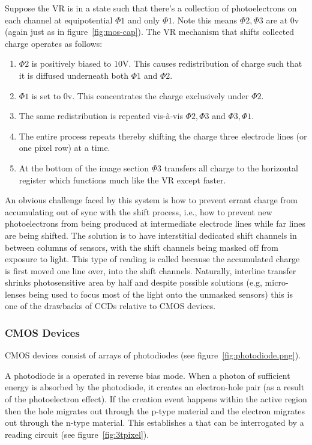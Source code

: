 Suppose the VR is in a state such that there's a collection of photoelectrons on each channel at equipotential \(\Phi1\) and only \(\Phi1\). Note this means \(\Phi2, \Phi3\) are at \(0\)v (again just as in figure~\ref{fig:mos-cap}). The VR mechanism that shifts collected charge operates as follows:
\begin{mdframed}
\begin{enumerate}
	\item \(\Phi2\) is positively biased to \(10\)V. This causes redistribution of charge such that it is diffused underneath both \(\Phi1\) and \(\Phi2\).
	\item \(\Phi1\) is set to \(0\)v. This concentrates the charge exclusively under \(\Phi2\).
	\item The same redistribution is repeated vis-à-vis \(\Phi2, \Phi3\) and \(\Phi3, \Phi1\).
	\item The entire process repeats thereby shifting the charge three electrode lines (or one pixel row) at a time.
	\item At the bottom of the image section \(\Phi3\) transfers all charge to the horizontal register which functions much like the VR except faster.
\end{enumerate}
\end{mdframed}
%
An obvious challenge faced by this system is how to prevent errant charge from accumulating out of sync with the shift process, i.e., how to prevent new photoelectrons from being produced at intermediate electrode lines while far lines are being shifted.
%
The solution is to have interstitial dedicated shift channels in between columns of sensors, with the shift channels being masked off from exposure to light.
%
This type of reading is called  because the accumulated charge is first moved one line over, into the shift channels.
%
Naturally, interline transfer shrinks photosensitive area by half and despite possible solutions (e.g, micro-lenses being used to focus most of the light onto the unmasked sensors) this is one of the drawbacks of CCDs relative to CMOS devices.

\subsubsection{CMOS Devices}

CMOS devices consist of arrays of photodiodes (see figure~\ref{fig:photodiode.png}).

A photodiode is a  operated in reverse bias mode.
%
When a photon of sufficient energy is absorbed by the photodiode, it creates an electron-hole pair (as a result of the photoelectron effect).
%
If the creation event happens within the active region then the hole migrates out through the p-type material and the electron migrates out through the n-type material.
%
This establishes a  that can be interrogated by a reading circuit (see figure~\ref{fig:3tpixel}).

